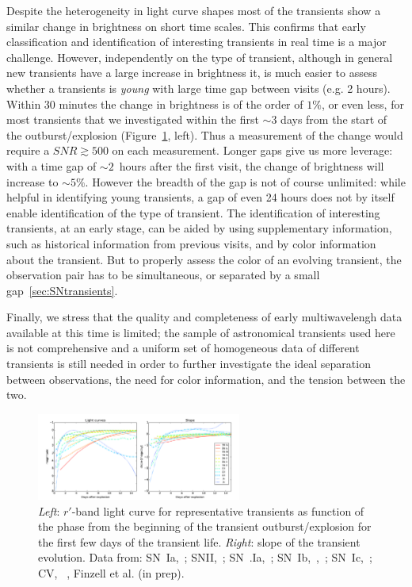 Despite the heterogeneity in light curve shapes most of the transients show a similar change in brightness on short time scales. 
This confirms that early classification and identification of interesting transients in real time is a major challenge. However, independently on the type of transient, although in general new transients have a large increase in brightness it, is much easier to assess whether a transients is \emph{young} with large time gap between visits (e.g. 2 hours).
Within 30 minutes the change in brightness is of the order of $1\%$, or even less, for most transients that we investigated within the first $\sim3$ days from the start of the outburst/explosion (Figure~\ref{fig:earlyslope}, left). Thus a measurement of the change would require a $SNR\gtrsim500$ on each measurement. Longer gaps give us more leverage: with a time gap of $\sim2$~hours after the first visit, the change of brightness will increase to $\sim5\%$. However the breadth of the gap is not of course unlimited: while helpful in identifying young transients, a gap of even 24 hours does not by itself enable identification of the type of transient.  The identification of interesting transients, at an early stage, can be aided by using supplementary information, such as historical information from previous visits, and by color information about the transient. But to properly assess the color of an evolving transient, the observation pair has to be simultaneous, or separated by a small gap~\ref{sec:SNtransients}.

Finally, we stress that the quality and completeness of early multiwavelengh data available at this time is limited; the sample of astronomical transients used here is not comprehensive and a uniform set of homogeneous data of different transients is still needed in order to further investigate the ideal separation between observations, the need for color information, and the tension between the two. 

\begin{figure}[hbt]
\centerline{
\includegraphics[width=0.6\textwidth]{figs/transients/earlyslope.pdf}
}
\caption{\emph{Left}: $r'$-band light curve for representative transients as function of the phase from the beginning of the transient outburst/explosion for the first few days of the transient life. \emph{Right}: slope of the transient evolution. Data from: SN~Ia,~\citet{Olling15}; SNII,~\citet{Rubin16}; SN~.Ia,~\citet{Shen10}; SN~Ib,~\citet{Valenti11},~\citet{Cao13}; SN~Ic,~\citet{Mazzali02}; CV, ~\citet{Sokoloski13}, Finzell et al. (in prep).}
\label{fig:earlyslope}
\end{figure}

